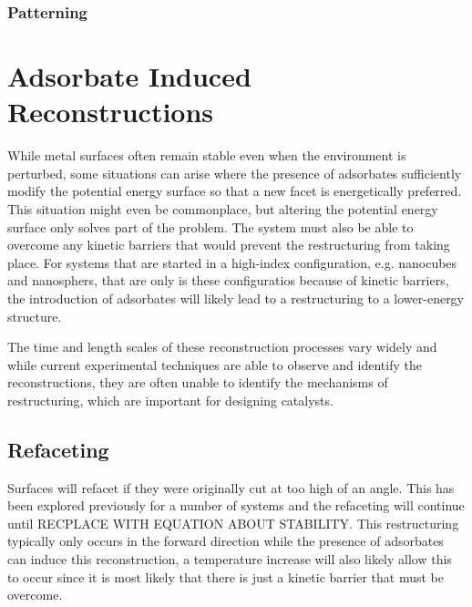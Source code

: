 \subsubsection{Patterning}

\section{Adsorbate Induced Reconstructions}

While metal surfaces often remain stable even when the environment is
perturbed, some situations can arise where the presence of adsorbates
sufficiently modify the potential energy surface so that a new facet is
energetically preferred. This situation might even be commonplace, but altering
the potential energy surface only solves part of the problem. The system must
also be able to overcome any kinetic barriers that would prevent the
restructuring from taking place. For systems that are started in a high-index
configuration, e.g. nanocubes and nanosphers, that are only is these
configuratios because of kinetic barriers, the introduction of adsorbates will
likely lead to a restructuring to a lower-energy structure. 

The time and length scales of these reconstruction processes vary
widely\citep{} and while current experimental techniques are able to observe
and identify the reconstructions, they are often unable to identify the
mechanisms of restructuring, which are important for designing catalysts.

\subsection{Refaceting}
Surfaces will refacet if they were originally cut at too high of an angle. This
has been explored previously for a number of systems\citep{} and the refaceting
will continue until RECPLACE WITH EQUATION ABOUT STABILITY. This restructuring
typically only occurs in the forward direction while the presence of adsorbates
can induce this reconstruction, a temperature increase will also likely allow
this to occur since it is most likely that there is just a kinetic barrier that
must be overcome. 

